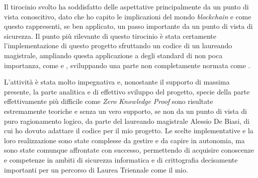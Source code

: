 Il tirocinio svolto ha soddisfatto delle aspettative principalmente da un punto di vista conoscitivo, dato che ho capito le implicazioni del mondo \textit{blockchain} e come questo rappresenti,
se ben applicato, un passo importante da un punto di vista di sicurezza. 
Il punto più rilevante di questo tirocinio è stata certamente l'implementazione di questo progetto sfruttando un codice di un laureando magistrale, ampliando questa applicazione a degli standard 
di non poca importanza, come  e , sviluppando una parte non completamente normata come . \\

\clearpage

L'attività è stata molto impegnativa e, nonostante il supporto di massima presente, la parte analitica e di effettivo sviluppo del progetto, specie della parte effettivamente più difficile come 
\textit{Zero Knowledge Proof} sono risultate estremamente teoriche e senza un vero supporto, se non da un punto di vista di puro ragionamento logico, da parte del laureando magistrale Alessio De Biasi, 
di cui ho dovuto adattare il codice per il mio progetto. Le scelte implementative e la loro realizzazione sono state complesse da gestire e da capire in autonomia, 
ma sono state comunque affrontate con successo, permettendo di acquisire conoscenze e competenze in ambiti di sicurezza informatica e di crittografia decisamente importanti per un percorso di Laurea Triennale come il mio. \\

